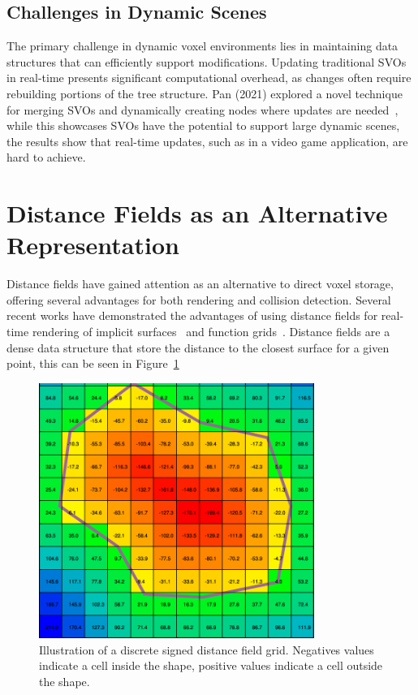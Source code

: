 \subsection{Challenges in Dynamic Scenes}
The primary challenge in dynamic voxel environments lies in maintaining data structures that can efficiently support
modifications. Updating traditional SVOs in real-time presents significant computational overhead, as changes often
require rebuilding portions of the tree structure. Pan (2021) explored a novel technique for merging SVOs and
dynamically creating nodes where updates are needed~\cite{pan2021dynamic}, while this showcases SVOs have the potential
to support large dynamic scenes, the results show that real-time updates, such as in a video game application, are hard
to achieve.

\section{Distance Fields as an Alternative Representation}
Distance fields have gained attention as an alternative to direct voxel storage, offering several advantages for both
rendering and collision detection. Several recent works have demonstrated the advantages of using distance fields for
real-time rendering of implicit surfaces~\cite{hadji2021raymarching} and function grids~\cite{soderlund2022ray}.
Distance fields are a dense data structure that store the distance to the closest surface for a given point, this can be
seen in Figure~\ref{fig:distance_field}

\begin{figure}[thp]
    \begin{center}
        \includegraphics[width=0.8\textwidth]{figures/distance_field.png}
    \end{center}
    \caption{Illustration of a discrete signed distance field grid. Negatives values indicate a cell inside the shape,
        positive values indicate a cell outside the shape.}
    \label{fig:distance_field}
\end{figure}

